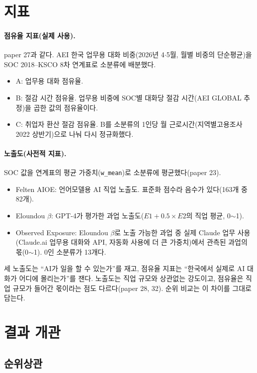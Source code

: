 \documentclass[11pt]{article}
\begin{document}
\section{지표}

\paragraph{점유율 지표(실제 사용).} paper 27과 같다. AEI 한국 업무용 대화 비중(2026년 4$\cdot$5월, 월별 비중의 단순평균)을 SOC 2018--KSCO 8차 연계표로 소분류에 배분했다.
\begin{itemize}[leftmargin=*]
  \item A: 업무용 대화 점유율.
  \item B: 절감 시간 점유율. 업무용 비중에 SOC별 대화당 절감 시간(AEI GLOBAL 추정)을 곱한 값의 점유율이다.
  \item C: 취업자 환산 절감 점유율. B를 소분류의 1인당 월 근로시간(지역별고용조사 2022 상반기)으로 나눠 다시 정규화했다.
\end{itemize}

\paragraph{노출도(사전적 지표).} SOC 값을 연계표의 평균 가중치(\texttt{w\_mean})로 소분류에 평균했다(paper 23).
\begin{itemize}[leftmargin=*]
  \item Felten AIOE: 언어모델용 AI 직업 노출도. 표준화 점수라 음수가 있다(163개 중 82개).
  \item Eloundou $\beta$: GPT-4가 평가한 과업 노출도($E1 + 0.5 \times E2$의 직업 평균, 0$\sim$1).
  \item Observed Exposure: Eloundou $\beta$로 노출 가능한 과업 중 실제 Claude 업무 사용(Claude.ai 업무용 대화와 API, 자동화 사용에 더 큰 가중치)에서 관측된 과업의 몫(0$\sim$1). 0인 소분류가 13개다.
\end{itemize}
세 노출도는 ``AI가 일을 할 수 있는가''를 재고, 점유율 지표는 ``한국에서 실제로 AI 대화가 어디에 몰리는가''를 잰다. 노출도는 직업 규모와 상관없는 강도이고, 점유율은 직업 규모가 들어간 몫이라는 점도 다르다(paper 28, 32). 순위 비교는 이 차이를 그대로 담는다.

\section{결과 개관}

\subsection{순위상관}
\end{document}
